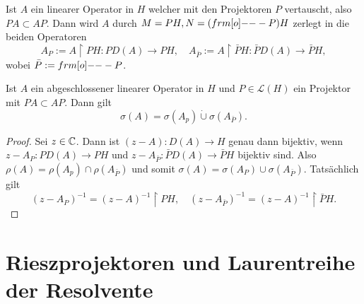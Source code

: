 \documentclass{mycourse}
\begin{document}
Ist $A$ ein linearer Operator in $H$ welcher mit den Projektoren $P$ vertauscht, also $PA\subset AP$. Dann wird $A$ durch $M=PH, N=(\1-P)H$ zerlegt in die beiden Operatoren
\[
A_P:=A \upharpoonright PH: PD(A) \to PH, \quad A_{\bar{P}}:=A \upharpoonright \bar PH: \bar P D(A) \to \bar{P}H,
\] 
wobei $\bar P:=\1-P$.
\begin{lem}\label{1.4}
Ist $A$ ein abgeschlossener linearer Operator in $H$ und $P\in \mathcal L(H)$ ein Projektor mit $PA \subset AP$. Dann gilt 
\[
\sigma(A)=\sigma(A_p)\dot\cup \sigma(A_{\bar{P}}).
\]
\end{lem}
\begin{proof}
Sei $z\in \mathbb{C}$. Dann ist $(z-A):D(A) \to H$ genau dann bijektiv, wenn $z-A_P: PD(A)\to PH$ und $z-A_{\bar{P}}:\bar P D(A) \to \bar P H$ bijektiv sind. Also $\rho(A)=\rho(A_p) \cap \rho(A_{\bar P})$ und somit $\sigma(A)=\sigma(A_P) \cup \sigma(A_{\bar P})$. Tatsächlich gilt
\[
(z-A_P)^{-1}=(z-A)^{-1} \upharpoonright PH, \quad (z-A_{\bar P})^{-1} = (z-A)^{-1} \upharpoonright \bar PH.
\]
\end{proof}
\section{Rieszprojektoren und Laurentreihe der Resolvente}
\end{document}
